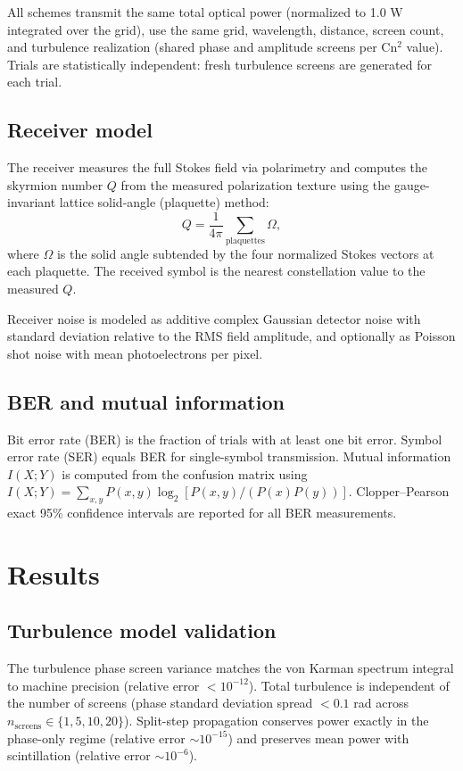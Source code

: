 \documentclass[11pt]{article}
\begin{document}
All schemes transmit the same total optical power (normalized to 1.0 W
integrated over the grid), use the same grid, wavelength, distance, screen
count, and turbulence realization (shared phase and amplitude screens per
Cn$^2$ value). Trials are statistically independent: fresh turbulence
screens are generated for each trial.

\subsection{Receiver model}

The receiver measures the full Stokes field via polarimetry and computes
the skyrmion number $Q$ from the measured polarization texture using the
gauge-invariant lattice solid-angle (plaquette) method:
\begin{equation}
Q = \frac{1}{4\pi} \sum_{\text{plaquettes}} \Omega,
\label{eq:plaquette}
\end{equation}
where $\Omega$ is the solid angle subtended by the four normalized Stokes
vectors at each plaquette. The received symbol is the nearest constellation
value to the measured $Q$.

Receiver noise is modeled as additive complex Gaussian detector noise with
standard deviation relative to the RMS field amplitude, and optionally as
Poisson shot noise with mean photoelectrons per pixel.

\subsection{BER and mutual information}

Bit error rate (BER) is the fraction of trials with at least one bit error.
Symbol error rate (SER) equals BER for single-symbol transmission. Mutual
information $I(X;Y)$ is computed from the confusion matrix using
$I(X;Y) = \sum_{x,y} P(x,y) \log_2 [P(x,y)/(P(x)P(y))]$.
Clopper--Pearson exact 95\% confidence intervals are reported for all BER
measurements.

\section{Results}

\subsection{Turbulence model validation}

The turbulence phase screen variance matches the von Karman spectrum
integral to machine precision (relative error $< 10^{-12}$). Total
turbulence is independent of the number of screens (phase standard
deviation spread $< 0.1$ rad across $n_\text{screens} \in \{1,5,10,20\}$).
Split-step propagation conserves power exactly in the phase-only regime
(relative error $\sim 10^{-15}$) and preserves mean power with scintillation
(relative error $\sim 10^{-6}$).
\end{document}
